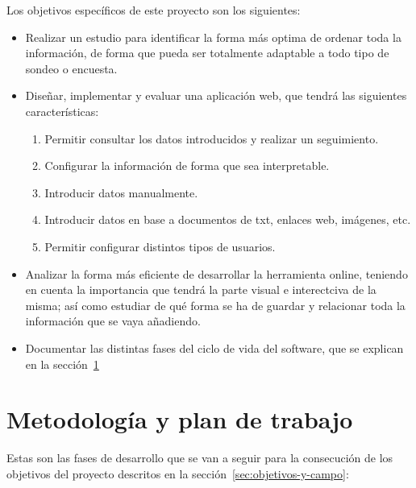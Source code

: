 Los objetivos específicos de este proyecto son los siguientes:

\begin{itemize}
\item Realizar un estudio para identificar la forma más optima de ordenar toda la información, de forma que pueda ser totalmente adaptable a todo tipo de sondeo o encuesta.
\item Diseñar, implementar y evaluar una aplicación web, que tendrá las
  siguientes características:

  \begin{enumerate}
  \item Permitir consultar los datos introducidos y realizar un seguimiento.
  \item Configurar la información de forma que sea interpretable.
  \item Introducir datos manualmente.
  \item Introducir datos en base a documentos de txt, enlaces web, imágenes, etc.
  \item Permitir configurar distintos tipos de usuarios.
  \end{enumerate}

\item Analizar la forma más eficiente de desarrollar la herramienta online, teniendo en cuenta la importancia que tendrá la parte visual e interectciva de la misma; así como estudiar de qué forma se ha de guardar y relacionar toda la información que se vaya añadiendo.

\item Documentar las distintas fases del ciclo de vida del software, que se explican en la sección~\ref{sec:metodologia-y-plan}

\end{itemize}


\section{Metodología y plan de trabajo}
\label{sec:metodologia-y-plan}

Estas son las fases de desarrollo que se van a seguir para la
consecución de los objetivos del proyecto descritos en la sección~\ref{sec:objetivos-y-campo}:

